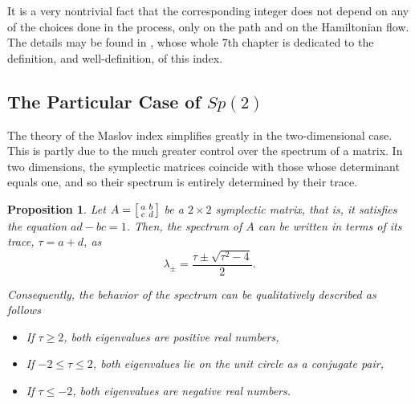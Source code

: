 \documentclass{article}
\newtheorem{prop}{Proposition}
\theoremstyle{nonumberplain}
\begin{document}
It is a very nontrivial fact that the corresponding integer does not depend on any of the choices done in the process, only on the path and on the Hamiltonian flow. The details may be found in \cite{audin}, whose whole 7th chapter is dedicated to the definition, and well-definition, of this index.

\subsection{The Particular Case of $Sp(2)$}\label{sec:maslovsp2}

The theory of the Maslov index simplifies greatly in the two-dimensional case. This is partly due to the much greater control over the spectrum of a matrix. In two dimensions, the symplectic matrices coincide with those whose determinant equals one, and so their spectrum is entirely determined by their trace.

\begin{prop}
Let $A = \mleft[\begin{smallmatrix} a & b \\ c & d \end{smallmatrix}\mright]$ be a $2 \times 2$ symplectic matrix, that is, it satisfies the equation $ad - bc = 1$. Then, the spectrum of $A$ can be written in terms of its trace, $\tau = a+d$, as
\begin{equation}\label{lambdafromtau}
\lambda_\pm = \frac{\tau \pm \sqrt{\tau^2 - 4}}2.
\end{equation}

Consequently, the behavior of the spectrum can be qualitatively described as follows
\begin{itemize}
\item If $\tau \geq 2$, both eigenvalues are positive real numbers,
\item If $-2 \leq \tau \leq 2$, both eigenvalues lie on the unit circle as a conjugate pair,
\item If $\tau \leq -2$, both eigenvalues are negative real numbers.
\end{itemize}
\end{prop}
\end{document}
